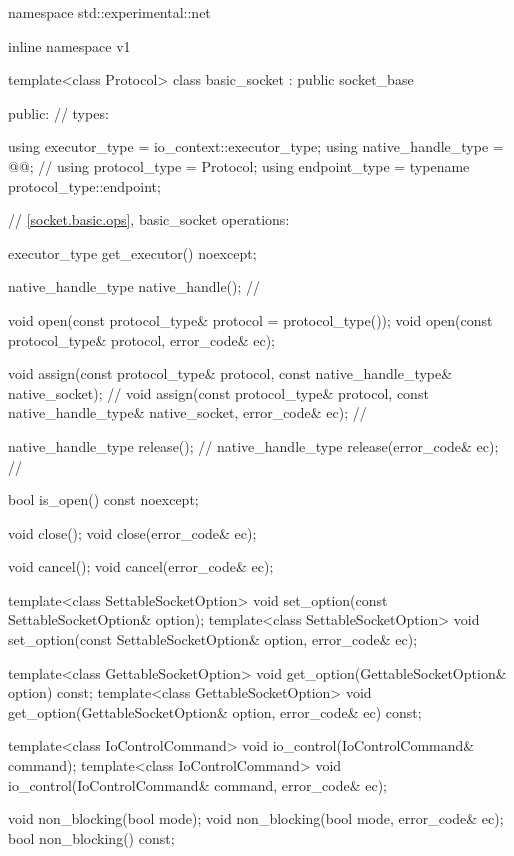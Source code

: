 \begin{codeblock}
namespace std::experimental::net {
inline namespace v1 {

  template<class Protocol>
  class basic_socket : public socket_base
  {
  public:
    // types:

    using executor_type = io_context::executor_type;
    using native_handle_type = @@; // \nativeref
    using protocol_type = Protocol;
    using endpoint_type = typename protocol_type::endpoint;

    // \ref{socket.basic.ops}, basic_socket operations:

    executor_type get_executor() noexcept;

    native_handle_type native_handle(); // \nativeref

    void open(const protocol_type& protocol = protocol_type());
    void open(const protocol_type& protocol, error_code& ec);

    void assign(const protocol_type& protocol,
                const native_handle_type& native_socket); // \nativeref
    void assign(const protocol_type& protocol,
                const native_handle_type& native_socket,
                error_code& ec); // \nativeref

    native_handle_type release(); // \nativeref
    native_handle_type release(error_code& ec); // \nativeref

    bool is_open() const noexcept;

    void close();
    void close(error_code& ec);

    void cancel();
    void cancel(error_code& ec);

    template<class SettableSocketOption>
      void set_option(const SettableSocketOption& option);
    template<class SettableSocketOption>
      void set_option(const SettableSocketOption& option, error_code& ec);

    template<class GettableSocketOption>
      void get_option(GettableSocketOption& option) const;
    template<class GettableSocketOption>
      void get_option(GettableSocketOption& option, error_code& ec) const;

    template<class IoControlCommand>
      void io_control(IoControlCommand& command);
    template<class IoControlCommand>
      void io_control(IoControlCommand& command, error_code& ec);

    void non_blocking(bool mode);
    void non_blocking(bool mode, error_code& ec);
    bool non_blocking() const;

}}}
\end{codeblock}
